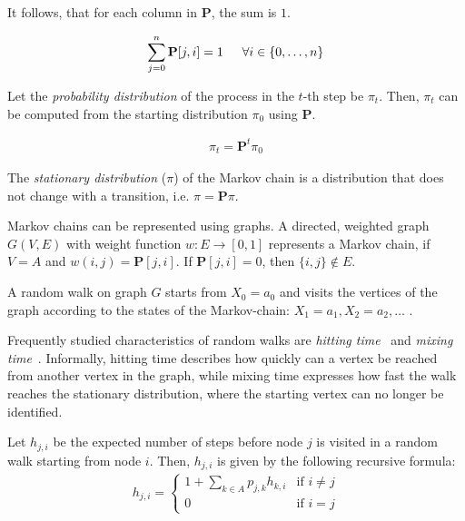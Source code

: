 It follows, that for each column in $\mathbf{P}$, the sum is $1$.

\begin{align*}
    \sum\limits_{j=0}^{n}\mathbf{P}[j,i] = 1 \hspace{15pt} \forall i \in \{0,\dots,n\}
\end{align*}

Let the \textit{probability distribution} of the process in the $t$-th step be $\pi_t$. Then, $\pi_t$ can be computed from the starting distribution $\pi_0$ using $\mathbf{P}$.

\begin{align*}
\pi_{t} = \mathbf{P}^t\pi_{0}
\end{align*}

The \textit{stationary distribution} ($\pi$) of the Markov chain is a distribution that does not change with a transition, i.e. $\pi = \mathbf{P}\pi$.

Markov chains can be represented using graphs. A directed, weighted graph $G(V,E)$ with weight function $w:E\rightarrow{}[0,1]$ represents a Markov chain, if $V=A$ and $w(i,j) = \mathbf{P}[j,i]$. If $\mathbf{P}[j,i] = 0$, then $\{i,j\} \not\in E$.

A random walk on graph $G$ starts from $X_0 = a_0$ and visits the vertices of the graph according to the states of the Markov-chain: $X_1 = a_1, X_2 = a_2, \dots$ .

Frequently studied characteristics of random walks are \textit{hitting time}~\cite{XiaReview} and \textit{mixing time}~\cite{MitzenmacherProbability}. Informally, hitting time describes how quickly can a vertex be reached from another vertex in the graph, while mixing time expresses how fast the walk reaches the stationary distribution, where the starting vertex can no longer be identified.

\begin{definition} Let $h_{j,i}$ be the expected number of steps before node $j$ is visited in a random walk starting from node $i$.
Then, $h_{j,i}$ is given by the following recursive formula:
\begin{align*}
    h_{j,i} = \left\{
        \begin{array}{lr}
            1 + \sum\limits_{k\in{}A}p_{j,k}h_{k,i} & \text{if } i\neq{}j\\
            0 & \text{if } i=j
        \end{array}
    \right.
\end{align*}
\end{definition}

